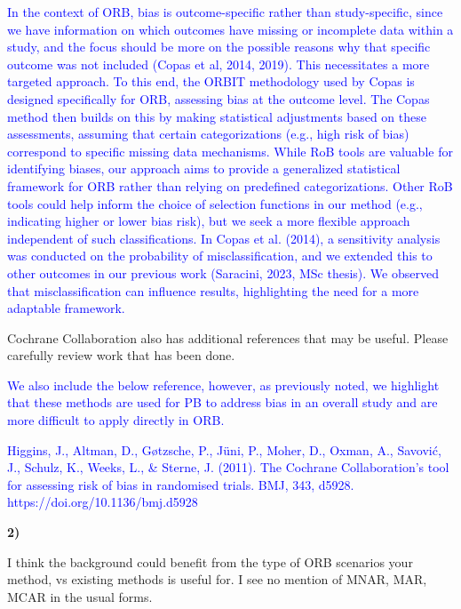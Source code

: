 \documentclass{article}
\begin{document}
\textcolor{blue}{In the context of ORB, bias is outcome-specific rather than study-specific, since we have information on which outcomes have missing or incomplete data within a study, and the focus should be more on the possible reasons why that specific outcome was not included (Copas et al, 2014, 2019). This necessitates a more targeted approach. To this end, the ORBIT methodology used by Copas is designed specifically for ORB, assessing bias at the outcome level. The Copas method then builds on this by making statistical adjustments based on these assessments, assuming that certain categorizations (e.g., high risk of bias) correspond to specific missing data mechanisms. While RoB tools are valuable for identifying biases, our approach aims to provide a generalized statistical framework for ORB rather than relying on predefined categorizations. Other RoB tools could help inform the choice of selection functions in our method (e.g., indicating higher or lower bias risk), but we seek a more flexible approach independent of such classifications. In Copas et al. (2014), a sensitivity analysis was conducted on the probability of misclassification, and we extended this to other outcomes in our previous work (Saracini, 2023, MSc thesis). We observed that misclassification can influence results, highlighting the need for a more adaptable framework.}

\bigskip

Cochrane Collaboration also has additional references that may be useful. Please carefully review work that has been done. 

\bigskip

\textcolor{blue}{We also include the below reference, however, as previously noted, we highlight that these methods are used for PB to address bias in an overall study and are more difficult to apply directly in ORB.}

\bigskip

\textcolor{blue}{Higgins, J., Altman, D., Gøtzsche, P., Jüni, P., Moher, D., Oxman, A., Savović, J., Schulz, K., Weeks, L., \& Sterne, J. (2011). The Cochrane Collaboration's tool for assessing risk of bias in randomised trials. BMJ, 343, d5928. https://doi.org/10.1136/bmj.d5928}

\bigskip

\textbf{2)}

\bigskip

I think the background could benefit from the type of ORB scenarios your method, vs existing methods is useful for. I see no mention of MNAR, MAR, MCAR in the usual forms. 
\end{document}
